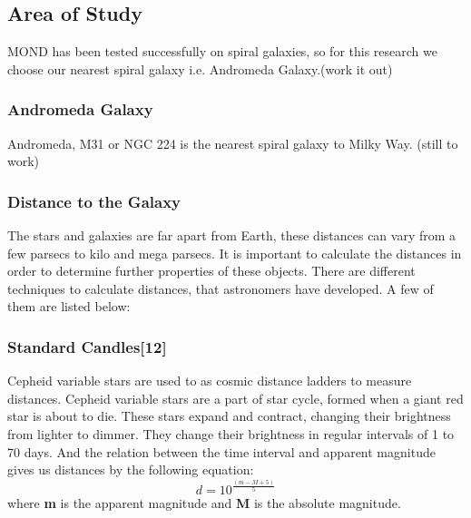 \documentclass{article}
\begin{document}
\subsection{Area of Study}
  MOND has been tested successfully on spiral galaxies, so for this research we choose our nearest spiral galaxy i.e. Andromeda Galaxy.(work it out)
  \subsubsection{Andromeda Galaxy}
  Andromeda, M31 or NGC 224 is the nearest spiral galaxy to Milky Way.  (still to work)
\subsubsection{Distance to the Galaxy}
The stars and galaxies are far apart from Earth, these distances can vary from a few parsecs to kilo and mega parsecs. It is important to calculate the distances in order to determine further properties of these objects. There are different techniques to calculate distances, that astronomers have developed. 
A few of them are listed below:
\subsubsection{Standard Candles[12]}
 Cepheid variable stars are used to as cosmic distance ladders to measure distances. Cepheid variable stars are a part of star cycle, formed when a giant red star is about to die. These stars expand and contract, changing their brightness from lighter to dimmer.  They change their brightness in regular intervals of 1 to 70 days. And the relation between the time interval and apparent magnitude gives us distances by the following equation:
 \begin{equation}
 d= 10^{\frac{(m-M+5)}{5}}
 \end{equation}
where \textbf{m} is the apparent magnitude and \textbf{M} is the absolute magnitude.
\end{document}
